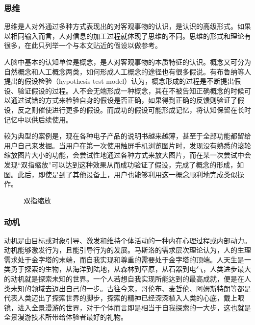 \subsubsection{思维}
思维是人对外通过多种方式表现出的对客观事物的认识，是认识的高级形式。如果以相同输入而言，人对信息的加工过程就体现了思维的不同。思维的形式和理论有很多，在此只列举一个与本文贴近的假设以做参考。

人脑中基本的认知单位是概念，是人对客观事物的本质特征的认识。概念又可分为自然概念和人工概念两类，如何形成人工概念的途径也有很多假说。有布鲁纳等人提出的假设检验（hypothesis test model）认为，概念形成的过程是不断提出假设、验证假设的过程。人不会无端形成一种概念，其在不被告知正确概念的时候可以通过试错的方式来检验自身的假设是否正确，如果得到正确的反馈则验证了假设，反之则催使进行更多的假设。而成功的假设可能形成记忆，将认知保留在长时记忆中以供后续使用。

较为典型的案例是，现在各种电子产品的说明书越来越薄，甚至于全部功能都留给用户自己来发掘。当用户在第一次使用触屏手机浏览图片时，发现没有熟悉的滚轮缩放图片大小的功能，会尝试性地通过各种方式来放大图片，而在某一次尝试中会发现“双指缩放”可以达到这种效果从而成功验证了假设，完成了概念的形成，如图。此后，即使是到了其他设备上，用户也能够利用这一概念顺利地完成类似操作。

\begin{figure}[htp]
\centering
{}
\caption{双指缩放}
\label{fig:stretch}
\end{figure}

\subsubsection{动机}
动机是由目标或对象引导、激发和维持个体活动的一种内在心理过程或内部动力。动机能够激发行为，且能引导行为的发展。马斯洛的需求层次理论认为，人的生理需求处于金字塔的末端，而自我实现和尊重的需要处于金字塔的顶端。人天生是一类勇于探索的生物，从海洋到陆地，从森林到草原，从石器到电气，人类进步最大的动机就是探索未知的世界。一个人若想自我实现所能达到的最高成就，便是在人类未知的领域去迈出自己的一步。古往今来，哥伦布、麦哲伦、阿姆斯特朗等都是代表人类迈出了探索世界的脚步，探索的精神已经深深植入人类的心底，戴上眼镜，进入全景漫游的世界，对于个体而言即是相当于自我探索的一大步，这也就是全景漫游技术所带给体验者最好的礼物。
